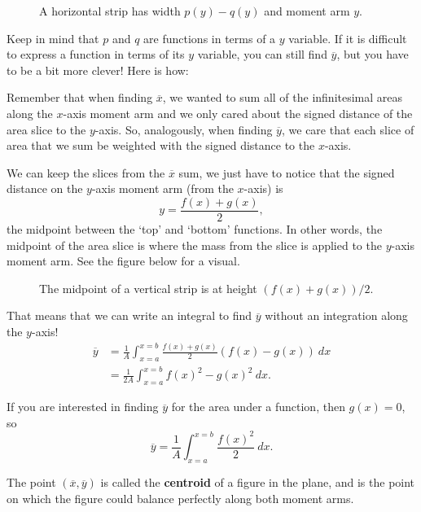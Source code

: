 \begin{figure}[H]
\centering

\caption{A horizontal strip has width $p(y)-q(y)$ and moment arm $y$.}
\end{figure}


Keep in mind that $p$ and $q$ are functions in terms of a $y$ variable. If it is difficult to express a function in terms of its $y$ variable, you can still find $\overline{y}$, but you have to be a bit more clever! Here is how:

Remember that when finding $\overline{x}$, we wanted to sum all of the infinitesimal areas along the $x$-axis moment arm and we only cared about the signed distance of the area slice to the $y$-axis. So, analogously, when finding $\overline{y}$, we care that each slice of area that we sum be weighted with the signed distance to the $x$-axis.


We can keep the slices from the $\overline{x}$ sum, we just have to notice that the signed distance on the $y$-axis moment arm (from the $x$-axis) is
$$y=\frac{f(x)+g(x)}{2},$$
the midpoint between the `top' and `bottom' functions. In other words, the midpoint of the area slice is where the mass from the slice is applied to the $y$-axis moment arm. See the figure below for a visual.

\begin{figure}[H]
\centering

\caption{The midpoint of a vertical strip is at height $(f(x)+g(x))/2$.}
\end{figure}

That means that we can write an integral to find $\overline{y}$ without an integration along the $y$-axis!
\begin{align*}
\overline{y}&=\frac{1}{A}\int_{x=a}^{x=b}\frac{f(x)+g(x)}{2}(f(x)-g(x))\ dx\\
& =\frac{1}{2A}\int_{x=a}^{x=b}f(x)^2-g(x)^2\ dx.
\end{align*}

If you are interested in finding $\overline{y}$ for the area under a function, then $g(x)=0$, so
$$
\overline{y} = \frac{1}{A}\int_{x=a}^{x=b}\frac{f(x)^2}{2}\ dx.
$$

The point $(\overline{x},\overline{y})$ is called the \textbf{centroid} of a figure in the plane, and is the point on which the figure could balance perfectly along both moment arms.


